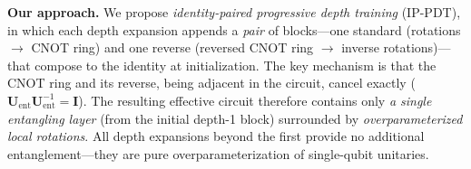 \documentclass[11pt]{article}
\theoremstyle{plain}
\theoremstyle{plain}
\begin{document}
\medskip\noindent\textbf{Our approach.}
We propose \emph{identity-paired progressive depth training} (IP-PDT),
in which each depth expansion appends a \emph{pair} of blocks---one
standard (rotations $\to$ CNOT ring) and one reverse (reversed CNOT
ring $\to$ inverse rotations)---that compose to the identity at
initialization.  The key mechanism is that the CNOT ring and its
reverse, being adjacent in the circuit, cancel exactly
($\mathbf{U}_{\mathrm{ent}} \mathbf{U}_{\mathrm{ent}}^{-1}=\mathbf{I}$).  The resulting effective
circuit therefore contains only \textit{a single entangling layer}
(from the initial depth-1 block) surrounded by
\textit{overparameterized local rotations}.  All depth expansions
beyond the first provide no additional entanglement---they are pure
overparameterization of single-qubit unitaries. 
\end{document}
